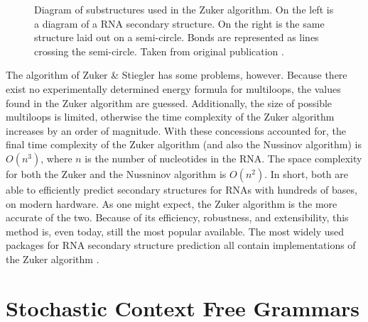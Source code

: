 \documentclass[12pt, a4paper]{article}
\begin{document}
\begin{figure}
\begin{center}
\end{center}
\caption{Diagram of substructures used in the Zuker algorithm. On the left is a diagram of a RNA secondary structure. On the right is the same structure laid out on a semi-circle. Bonds are represented as lines crossing the semi-circle. Taken from original
publication \cite{zuker1981optimal}.}
\label{fig:zuk_struct}
\end{figure}


The algorithm of Zuker \& Stiegler \cite{zuker1981optimal} has some problems, however. Because there exist no experimentally determined energy formula for multiloops, the values found in the Zuker algorithm are guessed. Additionally, the size of possible multiloops is limited, otherwise the time complexity of the Zuker algorithm increases by an order of magnitude. With these concessions accounted for, the final time complexity of the Zuker algorithm (and also the Nussinov algorithm) is $O(n^3)$, where $n$ is the number of nucleotides in the RNA. The space complexity for both the Zuker and the Nussninov algorithm is $O(n^2)$. In short, both are able to efficiently predict secondary structures for RNAs with hundreds of bases, on modern hardware. As one might expect, the Zuker algorithm is the more accurate of the two. Because of
its efficiency, robustness, and extensibility, this method is,
even today, still the most popular available. The most widely used packages for RNA secondary structure prediction all contain implementations of the Zuker algorithm \cite{lorenz2011viennarna, reuter2010rnastructure}.


\section{Stochastic Context Free Grammars}
\end{document}
